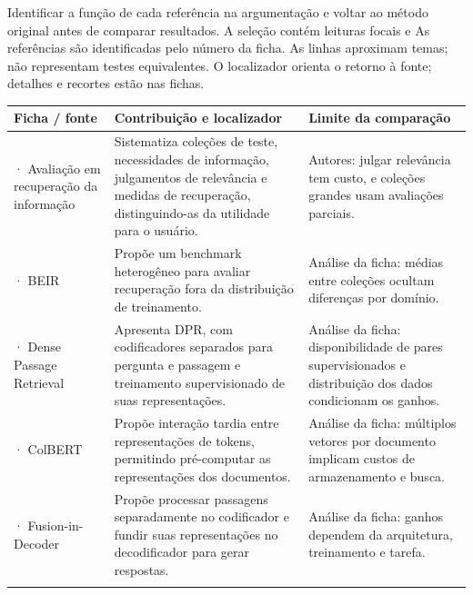 Identificar a função de cada referência na argumentação e voltar ao método original antes de comparar resultados. A seleção contém leituras focais e
\clearpage
{}
As referências são identificadas pelo número da ficha. As linhas aproximam temas; não representam testes equivalentes. O localizador orienta o retorno à fonte; detalhes e recortes estão nas fichas.

{\small\renewcommand{\arraystretch}{1.3}
\begin{tabularx}{\textwidth}{@{}>{\raggedright\arraybackslash}p{29mm}>{\raggedright\arraybackslash}X>{\raggedright\arraybackslash}X@{}}
\toprule
\textbf{Ficha / fonte} & \textbf{Contribuição e localizador} & \textbf{Limite da comparação}\\
\midrule
20 · Avaliação em recuperação da informação & Sistematiza coleções de teste, necessidades de informação, julgamentos de relevância e medidas de recuperação, distinguindo-as da utilidade para o usuário.\par\smallskip{\footnotesize Seção 8.1} & Autores: julgar relevância tem custo, e coleções grandes usam avaliações parciais.\\
\addlinespace[5pt]
21 · BEIR & Propõe um benchmark heterogêneo para avaliar recuperação fora da distribuição de treinamento.\par\smallskip{\footnotesize Resumo} & Análise da ficha: médias entre coleções ocultam diferenças por domínio.\\
\addlinespace[5pt]
22 · Dense Passage Retrieval & Apresenta DPR, com codificadores separados para pergunta e passagem e treinamento supervisionado de suas representações.\par\smallskip{\footnotesize Resumo} & Análise da ficha: disponibilidade de pares supervisionados e distribuição dos dados condicionam os ganhos.\\
\addlinespace[5pt]
23 · ColBERT & Propõe interação tardia entre representações de tokens, permitindo pré-computar as representações dos documentos.\par\smallskip{\footnotesize Resumo} & Análise da ficha: múltiplos vetores por documento implicam custos de armazenamento e busca.\\
\addlinespace[5pt]
24 · Fusion-in-Decoder & Propõe processar passagens separadamente no codificador e fundir suas representações no decodificador para gerar respostas.\par\smallskip{\footnotesize Resumo} & Análise da ficha: ganhos dependem da arquitetura, treinamento e tarefa.\\
\addlinespace[5pt]
\bottomrule
\end{tabularx}}

